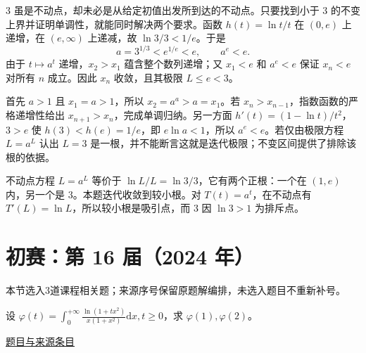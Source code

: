\documentclass[12pt,fontset=fandol]{ctexart}
\begin{document}
\begin{solve}\label{ans:ch03-15th-A:6}

$3$ 虽是不动点，却未必是从给定初值出发所到达的不动点。只要找到小于 $3$ 的不变上界并证明单调性，就能同时解决两个要求。函数 $h(t)=\ln t/t$ 在 $(0,e)$ 上递增，在 $(e,\infty)$ 上递减，故 $\ln3/3<1/e$。于是
\[
a=3^{1/3}<e^{1/e}<e,\qquad a^e<e.
\]
由于 $t\mapsto a^t$ 递增，$x_2>x_1$ 蕴含整个数列递增；又 $x_1<e$ 和 $a^e<e$ 保证 $x_n<e$ 对所有 $n$ 成立。因此 $x_n$ 收敛，且其极限 $L\leq e<3$。

首先 $a>1$ 且 $x_1=a>1$，所以 $x_2=a^a>a=x_1$。若 $x_n>x_{n-1}$，指数函数的严格递增性给出 $x_{n+1}>x_n$，完成单调归纳。另一方面 $h'(t)=(1-\ln t)/t^2$，$3>e$ 使 $h(3)<h(e)=1/e$，即 $e\ln a<1$，所以 $a^e<e$。若仅由极限方程 $L=a^L$ 认出 $L=3$ 是一根，并不能断言这就是迭代极限；不变区间提供了排除该根的依据。

\end{solve}

\begin{remark}[方法与条件]不动点方程 $L=a^L$ 等价于 $\ln L/L=\ln3/3$，它有两个正根：一个在 $(1,e)$ 内，另一个是 $3$。本题迭代收敛到较小根。对 $T(t)=a^t$，在不动点有 $T'(L)=\ln L$，所以较小根是吸引点，而 $3$ 因 $\ln3>1$ 为排斥点。\end{remark}

\section{初赛：第 16 届（2024 年）}

本节选入3道课程相关题；来源序号保留原题解编排，未选入题目不重新补号。

\begin{example}[来源序号2]\label{ex:ch02-16th-A:2}\label{pr:ch02-16th-A:2}

设 $\varphi(t)=\int_{0}^{+\infty} \frac{\ln(1+tx^{2})}{x(1+x^{2})} \mathrm{d} x, t \geq 0$，求 $\varphi(1), \varphi(2)$。

\par\href{https://github.com/lzxcr/cmc-mathematics/blob/64916fa1fdbc3e444a652eca204d5669058ee321/src/problems/preliminary/16/02.md}{题目与来源条目}

\end{example}
\end{document}
